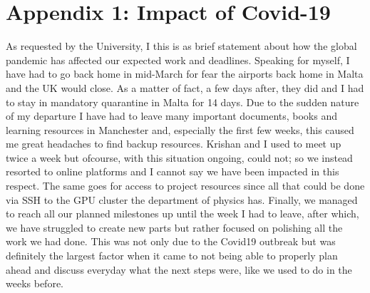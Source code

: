 \documentclass[11pt]{article} %
\begin{document}
\section*{Appendix 1: Impact of Covid-19}
As requested by the University, I this is as brief statement about how the global pandemic has
affected our expected work and deadlines.
Speaking for myself, I have had to go back home in mid-March for fear the airports
back home in Malta and the UK would close.
As a matter of fact, a few days after, they did and I had to stay in mandatory quarantine in Malta for 14 days.
Due to the sudden nature of my departure I have had to leave many important documents, books and learning resources
in Manchester and, especially the first few weeks, this caused me great headaches to find backup resources.
Krishan and I used to meet up twice a week but ofcourse, with this situation ongoing, could not; so we instead resorted
to online platforms and I cannot say we have been impacted in this respect.
The same goes for access to project resources since all that could be done via SSH to the GPU cluster the
department of physics has.
Finally, we managed to reach all our planned milestones up until the week I had to leave, after which,
we have struggled to create new parts but rather focused on polishing all the work we had done.
This was not only due to the Covid19 outbreak but was definitely the largest factor when it came to
not being able to properly plan ahead and discuss everyday what the next steps were, like we used to do in the weeks before.
\end{document}
